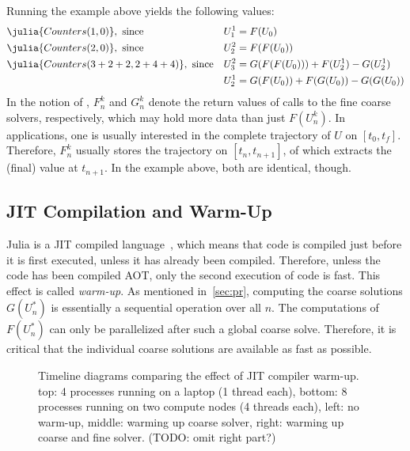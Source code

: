 Running the example above yields the following values:
\begin{align*}
  &\julia{Counters(1,0)}, \text{ since} &
  U_1^1 &= F(U_0) \\
  &\julia{Counters(2,0)}, \text{ since} &
  U_2^2 &= F(F(U_0)) \\
  &\julia{Counters(3+2+2,2+4+4)}, \text{ since} &
  U_3^2 &= G(F(F(U_0))) + F(U_2^1) - G(U_2^1) \\
  && U_2^1 &= G(F(U_0)) + F(G(U_0)) - G(G(U_0))
\end{align*}
In the notion of ,
$F_n^k$ and $G_n^k$ denote the return values of calls to the fine coarse solvers, respectively,
which may hold more data than just $F(U_n^k)$.
In applications, one is usually interested in the complete trajectory of $U$ on $[t_0,t_f]$.
Therefore, $F_n^k$ usually stores the trajectory on $[t_n,t_{n+1}]$,
of which  extracts the (final) value at $t_{n+1}$.
In the example above, both are identical, though.


\subsection{JIT Compilation and Warm-Up}

Julia is a \ac{JIT} compiled language~\cite{Julia},
which means that code is compiled just before it is first executed,
unless it has already been compiled.
Therefore, unless the code has been compiled \ac{AOT},
only the second execution of code is fast.
This effect is called \emph{warm-up}.
As mentioned in~\autoref{sec:pr}, computing the coarse solutions
$G(U_n^*)$ is essentially a sequential operation over all $n$.
The computations of $F(U^*_n)$ can only be parallelized after such a global coarse solve.
Therefore, it is critical that the individual coarse solutions are available as fast as possible.


\begin{figure}[htb]
  \caption[Timeline diagrams comparing the effect of JIT compiler warm-up.]{%
    Timeline diagrams comparing the effect of \acs{JIT} compiler warm-up.
    top: 4 processes running on a laptop (1 thread each),
    bottom: 8 processes running on two compute nodes (4 threads each),
    left: no warm-up,
    middle: warming up coarse solver,
    right: warming up coarse and fine solver.
    (TODO: omit right part?)
  }
  \label{fig:impl:warmup}
\end{figure}

